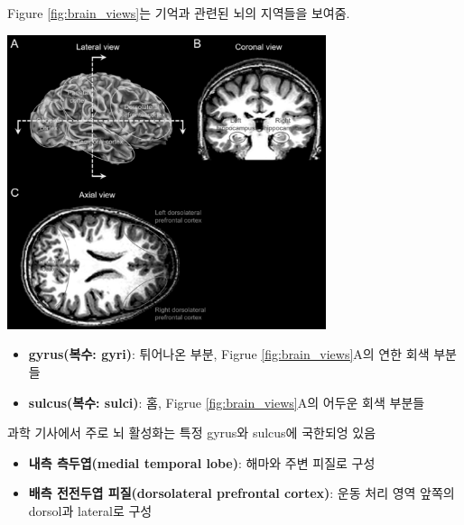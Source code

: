 \documentclass[../note.tex]{subfiles}
\begin{document}
{
  Figure \ref{fig:brain_views}는 기억과 관련된 뇌의 지역들을 보여줌.
  \begin{center}
    \includegraphics[width=0.7\textwidth]{image/brain_views}
    \label{fig:brain_views}
  \end{center}

  {
    \vspace{-2em}
    \begin{itemize}
      \item \textbf{gyrus(복수: gyri)}: 튀어나온 부분, Figrue \ref{fig:brain_views}A의 연한 회색 부분들
      \item \textbf{sulcus(복수: sulci)}: 홈, Figrue \ref{fig:brain_views}A의 어두운 회색 부분들
    \end{itemize}
    과학 기사에서 주로 뇌 활성화는 특정 gyrus와 sulcus에 국한되엉 있음
  }

  {
    \vspace{-2em}
    \begin{itemize}
      \item \textbf{내측 측두엽(medial temporal lobe)}: 해마와 주변 피질로 구성
      \item \textbf{배측 전전두엽 피질(dorsolateral prefrontal cortex)}: 운동 처리 영역 앞쪽의 dorsol과 lateral로 구성
    \end{itemize}
  }

}
\end{document}
